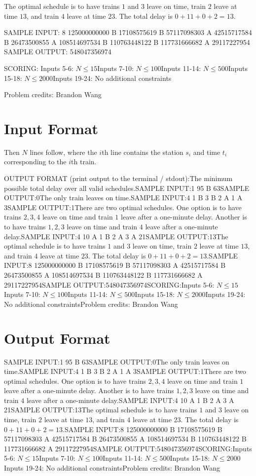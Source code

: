 \documentclass[12pt]{article}
\begin{document}
The optimal schedule is to have trains $1$ and $3$ leave on time, train $2$
leave at time $13$, and train $4$ leave at time $23$.  The total delay is
$0+11+0+2=13$.

SAMPLE INPUT:
8 125000000000
B 17108575619
B 57117098303
A 42515717584
B 26473500855
A 108514697534
B 110763448122
B 117731666682
A 29117227954
SAMPLE OUTPUT: 
548047356974

SCORING:
Inputs 5-6: $N \le 15$Inputs 7-10: $N \le 100$Inputs 11-14: $N \le 500$Inputs 15-18: $N\le 2000$Inputs 19-24: No additional constraints


Problem credits: Brandon Wang



\section*{Input Format}
Then $N$ lines follow, where the $i$th line  contains the station $s_i$  and
time $t_i$ corresponding to the $i$th train.

OUTPUT FORMAT (print output to the terminal / stdout):The minimum possible total delay over all valid schedules.SAMPLE INPUT:1 95
B 63SAMPLE OUTPUT:0The only train leaves on time.SAMPLE INPUT:4 1
B 3
B 2
A 1
A 3SAMPLE OUTPUT:1There are two optimal schedules. One option is to have trains $2,3,4$ leave on
time and train $1$ leave after a one-minute delay. Another is to have trains
$1,2,3$ leave on time and train $4$ leave after a one-minute delay.SAMPLE INPUT:4 10
A 1
B 2
A 3
A 21SAMPLE OUTPUT:13The optimal schedule is to have trains $1$ and $3$ leave on time, train $2$
leave at time $13$, and train $4$ leave at time $23$.  The total delay is
$0+11+0+2=13$.SAMPLE INPUT:8 125000000000
B 17108575619
B 57117098303
A 42515717584
B 26473500855
A 108514697534
B 110763448122
B 117731666682
A 29117227954SAMPLE OUTPUT:548047356974SCORING:Inputs 5-6: $N \le 15$Inputs 7-10: $N \le 100$Inputs 11-14: $N \le 500$Inputs 15-18: $N\le 2000$Inputs 19-24: No additional constraintsProblem credits: Brandon Wang

\section*{Output Format}
SAMPLE INPUT:1 95
B 63SAMPLE OUTPUT:0The only train leaves on time.SAMPLE INPUT:4 1
B 3
B 2
A 1
A 3SAMPLE OUTPUT:1There are two optimal schedules. One option is to have trains $2,3,4$ leave on
time and train $1$ leave after a one-minute delay. Another is to have trains
$1,2,3$ leave on time and train $4$ leave after a one-minute delay.SAMPLE INPUT:4 10
A 1
B 2
A 3
A 21SAMPLE OUTPUT:13The optimal schedule is to have trains $1$ and $3$ leave on time, train $2$
leave at time $13$, and train $4$ leave at time $23$.  The total delay is
$0+11+0+2=13$.SAMPLE INPUT:8 125000000000
B 17108575619
B 57117098303
A 42515717584
B 26473500855
A 108514697534
B 110763448122
B 117731666682
A 29117227954SAMPLE OUTPUT:548047356974SCORING:Inputs 5-6: $N \le 15$Inputs 7-10: $N \le 100$Inputs 11-14: $N \le 500$Inputs 15-18: $N\le 2000$Inputs 19-24: No additional constraintsProblem credits: Brandon Wang
\end{document}
